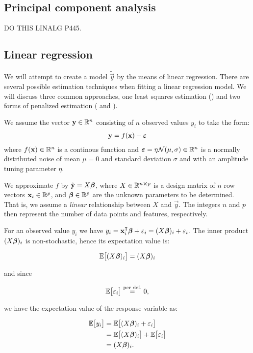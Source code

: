 \subsection{Principal component analysis}\label{sec:principal_comp}
DO THIS LINALG P445.  

\subsection{Linear regression}\label{sec:regression}
We will attempt to create a model $\tilde{\vec{y}}$ by the means of linear regression. 
There are several possible estimation techniques when fitting a linear regression model. We will discuss three common approaches, one least squares estimation () and two forms of penalized estimation ( and ).

We assume the vector $\vec{y} \in \RR[n]$ consisting of $n$ observed values $y_i$ to take the form:
\begin{align*}
    \vec{y}=f(\vec{x})+\svec{\epsilon}
\end{align*} where $f(\vec{x})\in\RR[n]$ is a continous function and $\svec{\epsilon}=\eta\mathcal{N}(\mu,\sigma)\in \RR[n] $ is a normally distributed noise of mean $\mu=0$ and standard deviation $\sigma$ and with an amplitude tuning parameter $\eta$. 

We approximate $f$ by $\tilde{\vec{y}}=X\svec{\beta}$, where $X\in \RR[n\cross p]$ is a design matrix of $n$ row vectors $\vec{x}_i\in \RR[p]$, and $\svec{\beta}\in \RR[p]$ are the unknown parameters to be determined. That is, we assume a \textit{linear} relationship between $X$ and $\vec{y}$. The integers $n$ and $p$ then represent the number of data points and features, respectively. 

For an observed value $y_i$ we have $y_i = \vec{x}_i\TT \svec{\beta} + \epsilon_i = \Xbi+ \epsilon_i$. The inner product $\Xbi$ is non-stochastic, hence its expectation value is:

\begin{align*}
    \EE{\Xbi} = \Xbi
\end{align*}

and since 

\begin{align*}
    \EE{\epsilon_i} \stackrel{\text{per def.}}{=} 0,
\end{align*}

we have the expectation value of the response variable as:

\begin{align*}
    \EE{y_i} &= \EE{\Xbi+ \epsilon_i} \\
    &= \EE{\Xbi} + \EE{\epsilon_i} \\
    &= \Xbi.
\end{align*}

